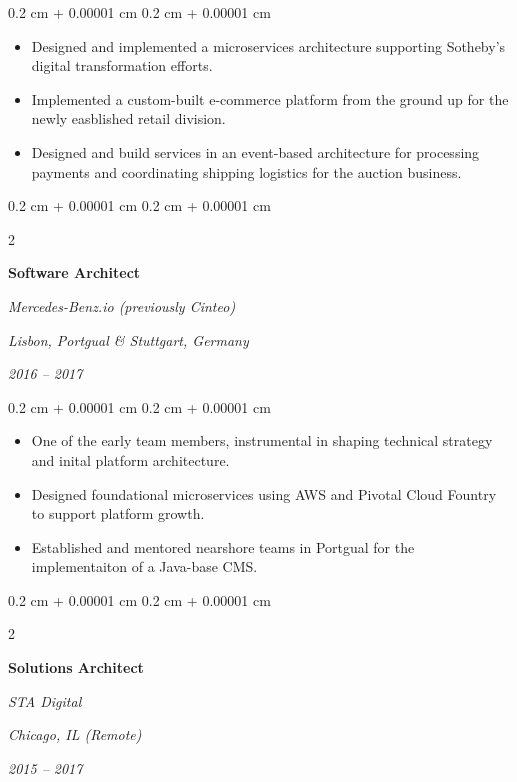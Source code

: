 \documentclass[10pt, a4paper]{article}
\newenvironment{highlights}{
    \begin{itemize}[
        topsep=0.10 cm,
        parsep=0.10 cm,
        partopsep=0pt,
        itemsep=0pt,
        leftmargin=0.4 cm + 10pt
    ]
}{
    \end{itemize}
} %
\newenvironment{onecolentry}{
    \begin{adjustwidth}{
        0.2 cm + 0.00001 cm
    }{
        0.2 cm + 0.00001 cm
    }
}{
    \end{adjustwidth}
} %
\newenvironment{twocolentry}[2][]{
    \onecolentry
    \def\secondColumn{#2}
    \setcolumnwidth{\fill, 8 cm}
    \begin{paracol}{2}
}{
    \switchcolumn \raggedleft \secondColumn
    \end{paracol}
    \endonecolentry
} %
\begin{document}
\vspace{0.10 cm}
\begin{onecolentry}
    \begin{highlights}
        \item Designed and implemented a microservices architecture supporting Sotheby's digital transformation efforts.
        \item Implemented a custom-built e-commerce platform from the ground up for the newly easblished retail division.
        \item Designed and build services in an event-based architecture for processing payments and coordinating shipping logistics for the auction business.
    \end{highlights}
\end{onecolentry}

\vspace{0.2 cm}

%
%
\begin{twocolentry}{
        \textit{Lisbon, Portgual \& Stuttgart, Germany}

        \textit{2016 – 2017}}
    \textbf{Software Architect}

    \textit{Mercedes-Benz.io (previously Cinteo)}
\end{twocolentry}

\vspace{0.10 cm}
\begin{onecolentry}
    \begin{highlights}
        \item One of the early team members, instrumental in shaping technical strategy and inital platform architecture.
        \item Designed foundational microservices using AWS and Pivotal Cloud Fountry to support platform growth.
        \item Established and mentored nearshore teams in Portgual for the implementaiton of a Java-base CMS.
    \end{highlights}
\end{onecolentry}

\vspace{0.20 cm}



%
%
\begin{twocolentry}{
        \textit{Chicago, IL (Remote)}

        \textit{2015 – 2017}}
    \textbf{Solutions Architect}

    \textit{STA Digital}
\end{twocolentry}
\end{document}
